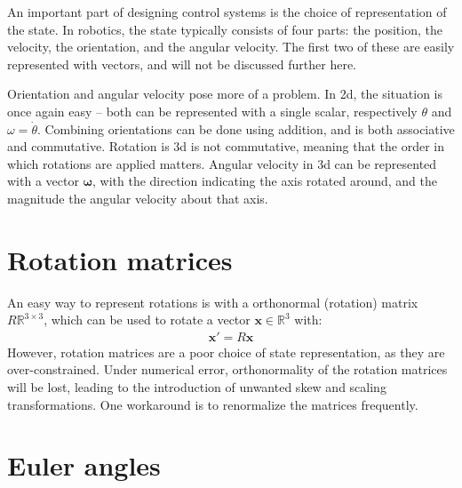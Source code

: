 \documentclass[main.tex]{subfiles}
\begin{document}
%
An important part of designing control systems is the choice of representation of the state. In robotics, the state typically consists of four parts: the position, the velocity, the orientation, and the angular velocity. The first two of these are easily represented with vectors, and will not be discussed further here.

Orientation and angular velocity pose more of a problem. In 2d, the situation is once again easy -- both can be represented with a single scalar, respectively $\theta$ and $\omega = \dot{\theta}$. Combining orientations can be done using addition, and is both associative and commutative. Rotation is 3d is not commutative, meaning that the order in which rotations are applied matters. Angular velocity in 3d can be represented with a vector $\bm{\omega}$, with the direction indicating the axis rotated around, and the magnitude the angular velocity about that axis.

\section{Rotation matrices}

An easy way to represent rotations is with a orthonormal (rotation) matrix $R \mathbb{R}^{3\times3}$, which can be used to rotate a vector $\bm{x} \in \mathbb{R}^{3}$ with:
\begin{align}
	\bm{x}' = R \bm{x}
\end{align}
However, rotation matrices are a poor choice of state representation, as they are over-constrained.
Under numerical error, orthonormality of the rotation matrices will be lost, leading to the introduction of unwanted skew and scaling transformations. One workaround is to renormalize the matrices frequently.


\section{Euler angles}
\label{app:euler-angles}
\end{document}
